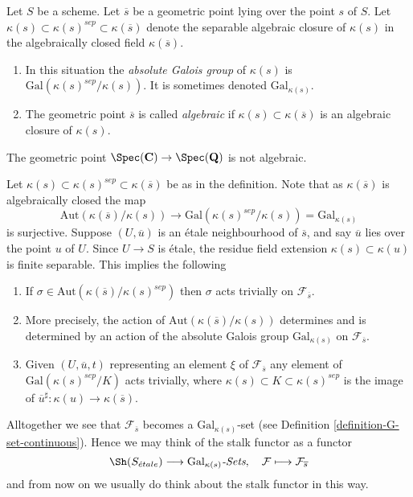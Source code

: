 \begin{definition}
\label{definition-algebraic-geometric-point}
Let $S$ be a scheme.
Let $\overline{s}$ be a geometric point lying over the point $s$ of $S$.
Let $\kappa(s) \subset \kappa(s)^{sep} \subset \kappa(\overline{s})$
denote the separable algebraic closure of $\kappa(s)$ in the algebraically
closed field $\kappa(\overline{s})$.
\begin{enumerate}
\item In this situation the {\it absolute Galois group} of $\kappa(s)$
is $\text{Gal}(\kappa(s)^{sep}/\kappa(s))$. It is sometimes denoted
$\text{Gal}_{\kappa(s)}$.
\item The geometric point $\overline{s}$ is called
{\it algebraic} if $\kappa(s) \subset \kappa(\overline{s})$ is
an algebraic closure of $\kappa(s)$.
\end{enumerate}
\end{definition}

\begin{example}
\label{example-stupid}
The geometric point
$\Spec(\mathbf{C}) \to \Spec(\mathbf{Q})$
is not algebraic.
\end{example}

\noindent
Let $\kappa(s) \subset \kappa(s)^{sep} \subset \kappa(\overline{s})$
be as in the definition. Note that as $\kappa(\overline{s})$ is algebraically
closed the map
$$
\text{Aut}(\kappa(\overline{s})/\kappa(s))
\longrightarrow
\text{Gal}(\kappa(s)^{sep}/\kappa(s)) = \text{Gal}_{\kappa(s)}
$$
is surjective. Suppose $(U, \overline{u})$ is an
\'etale neighbourhood of $\overline{s}$, and say $\overline{u}$ lies over
the point $u$ of $U$. Since $U \to S$ is \'etale, the residue field extension
$\kappa(s) \subset \kappa(u)$ is finite separable.
This implies the following
\begin{enumerate}
\item If $\sigma \in \text{Aut}(\kappa(\overline{s})/\kappa(s)^{sep})$
then $\sigma$ acts trivially on $\mathcal{F}_{\overline{s}}$.
\item More precisely, the action of
$\text{Aut}(\kappa(\overline{s})/\kappa(s))$
determines and is determined by an action of the absolute Galois group
$\text{Gal}_{\kappa(s)}$ on $\mathcal{F}_{\overline{s}}$.
\item Given $(U, \overline{u}, t)$ representing an element $\xi$ of
$\mathcal{F}_{\overline{s}}$ any element of
$\text{Gal}(\kappa(s)^{sep}/K)$ acts trivially, where
$\kappa(s) \subset K \subset \kappa(s)^{sep}$ is the image of
$\overline{u}^\sharp : \kappa(u) \to \kappa(\overline{s})$.
\end{enumerate}
Alltogether we see that $\mathcal{F}_{\overline{s}}$ becomes a
$\text{Gal}_{\kappa(s)}$-set (see
Definition \ref{definition-G-set-continuous}).
Hence we may think of the stalk functor as a functor
$$
\Sh(S_{\acute{e}tale}) \longrightarrow
\text{Gal}_{\kappa(s)}\textit{-Sets},
\quad
\mathcal{F} \longmapsto \mathcal{F}_{\overline{s}}
$$
and from now on we usually do think about the stalk functor in this way.

